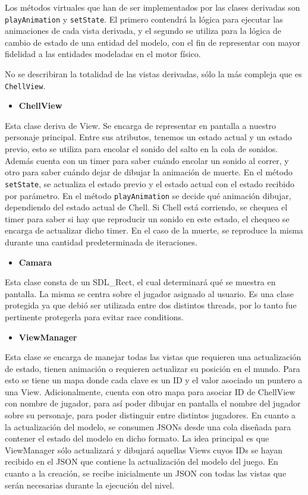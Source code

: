 \documentclass[a4paper]{article}
\begin{document}
Los métodos virtuales que han de ser implementados por las clases derivadas son \texttt{playAnimation} y \texttt{setState}. El primero contendrá la lógica para ejecutar las animaciones de cada vista derivada, y el segundo se utiliza para la lógica de cambio de estado de una entidad del modelo, con el fin de representar con mayor fidelidad a las entidades modeladas en el motor físico.

No se describiran la totalidad de las vistas derivadas, sólo la más compleja que es \texttt{ChellView}.

\begin{itemize}
	\item \textbf{ChellView}
\end{itemize}

Esta clase deriva de View. Se encarga de representar en pantalla a nuestro personaje principal.
Entre sus atributos, tenemos un estado actual y un estado previo, esto se utiliza para encolar el sonido del salto en la cola de sonidos. Además cuenta con un timer para saber cuándo encolar un sonido al correr, y otro para saber cuándo dejar de dibujar la animación de muerte.
En el método \texttt{setState}, se actualiza el estado previo y el estado actual con el estado recibido por parámetro.
En el método \texttt{playAnimation} se decide qué animación dibujar, dependiendo del estado actual de Chell. Si Chell está corriendo, se chequea el timer para saber si hay que reproducir un sonido en este estado, el chequeo se encarga de actualizar dicho timer.
En el caso de la muerte, se reproduce la misma durante una cantidad predeterminada de iteraciones.

\begin{itemize}
	\item \textbf{Camara}
\end{itemize}

Esta clase consta de un SDL\_Rect, el cual determinará qué se muestra en pantalla. La misma se centra sobre el jugador asignado al usuario.
Es una clase protegida ya que debió ser utilizada entre dos distintos threads, por lo tanto fue pertinente protegerla para evitar race conditions.

\begin{itemize}
	\item \textbf{ViewManager}
\end{itemize}

Esta clase se encarga de manejar todas las vistas que requieren una actualización de estado, tienen animación o requieren actualizar su posición en el mundo.
Para esto se tiene un mapa donde cada clave es un ID y el valor asociado un puntero a una View. Adicionalmente, cuenta con otro mapa para asociar ID de ChellView con nombre de jugador, para así poder dibujar en pantalla el nombre del jugador sobre su personaje, para poder distinguir entre distintos jugadores.
En cuanto a la actualización del modelo, se consumen JSONs desde una cola diseñada para contener el estado del modelo en dicho formato. La idea principal es que ViewManager sólo actualizará y dibujará aquellas  Views cuyos IDs se hayan recibido en el JSON que contiene la actualización del modelo del juego.
En cuanto a la creación, se recibe inicialmente un JSON con todas las vistas que serán necesarias durante la ejecución del nivel.
\end{document}
